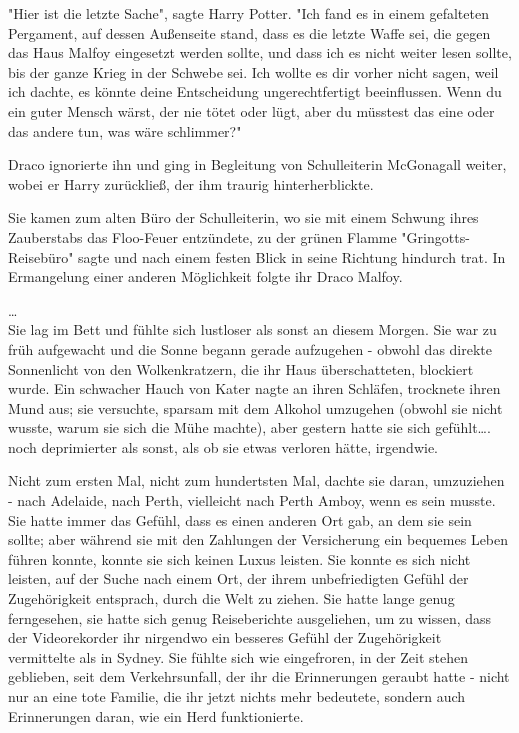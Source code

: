 {"Hier ist die letzte Sache", sagte Harry Potter. "Ich fand es in einem gefalteten Pergament, auf dessen Außenseite stand, dass es die letzte Waffe sei, die gegen das Haus Malfoy eingesetzt werden sollte, und dass ich es nicht weiter lesen sollte, bis der ganze Krieg in der Schwebe sei. Ich wollte es dir vorher nicht sagen, weil ich dachte, es könnte deine Entscheidung ungerechtfertigt beeinflussen. Wenn du ein guter Mensch wärst, der nie tötet oder lügt, aber du müsstest das eine oder das andere tun, was wäre schlimmer?"

Draco ignorierte ihn und ging in Begleitung von Schulleiterin McGonagall weiter, wobei er Harry zurückließ, der ihm traurig hinterherblickte.

Sie kamen zum alten Büro der Schulleiterin, wo sie mit einem Schwung ihres Zauberstabs das Floo-Feuer entzündete, zu der grünen Flamme "Gringotts-Reisebüro" sagte und nach einem festen Blick in seine Richtung hindurch trat. In Ermangelung einer anderen Möglichkeit folgte ihr Draco Malfoy.

…\\ Sie lag im Bett und fühlte sich lustloser als sonst an diesem Morgen. Sie war zu früh aufgewacht und die Sonne begann gerade aufzugehen - obwohl das direkte Sonnenlicht von den Wolkenkratzern, die ihr Haus überschatteten, blockiert wurde. Ein schwacher Hauch von Kater nagte an ihren Schläfen, trocknete ihren Mund aus; sie versuchte, sparsam mit dem Alkohol umzugehen (obwohl sie nicht wusste, warum sie sich die Mühe machte), aber gestern hatte sie sich gefühlt…. noch deprimierter als sonst, als ob sie etwas verloren hätte, irgendwie.

Nicht zum ersten Mal, nicht zum hundertsten Mal, dachte sie daran, umzuziehen - nach Adelaide, nach Perth, vielleicht nach Perth Amboy, wenn es sein musste. Sie hatte immer das Gefühl, dass es einen anderen Ort gab, an dem sie sein sollte; aber während sie mit den Zahlungen der Versicherung ein bequemes Leben führen konnte, konnte sie sich keinen Luxus leisten. Sie konnte es sich nicht leisten, auf der Suche nach einem Ort, der ihrem unbefriedigten Gefühl der Zugehörigkeit entsprach, durch die Welt zu ziehen. Sie hatte lange genug ferngesehen, sie hatte sich genug Reiseberichte ausgeliehen, um zu wissen, dass der Videorekorder ihr nirgendwo ein besseres Gefühl der Zugehörigkeit vermittelte als in Sydney. Sie fühlte sich wie eingefroren, in der Zeit stehen geblieben, seit dem Verkehrsunfall, der ihr die Erinnerungen geraubt hatte - nicht nur an eine tote Familie, die ihr jetzt nichts mehr bedeutete, sondern auch Erinnerungen daran, wie ein Herd funktionierte.

}
